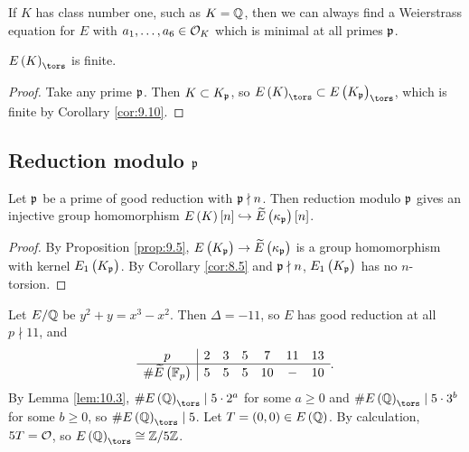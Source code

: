 \begin{remark*}
If $ K $ has class number one, such as $ K = \mathbb{Q} $, then we can always find a Weierstrass equation for $ E $ with $ a_1, \dots, a_6 \in \mathcal{O}_K $ which is minimal at all primes $ \mathfrak{p} $.
\end{remark*}

\begin{lemma}
$ E\br{K}_{\tors} $ is finite.
\end{lemma}

\begin{proof}
Take any prime $ \mathfrak{p} $. Then $ K \subset K_{\mathfrak{p}} $, so $ E\br{K}_{\tors} \subset E\br{K_\ppp}_{\tors} $, which is finite by Corollary \ref{cor:9.10}.
\end{proof}

\subsection{Reduction modulo \texorpdfstring{$ \mathfrak{p} $}{p}}

\begin{lemma}
\label{lem:10.3}
Let $ \mathfrak{p} $ be a prime of good reduction with $ \mathfrak{p} \nmid n $. Then reduction modulo $ \mathfrak{p} $ gives an injective group homomorphism $ E\br{K}\sbr{n} \hookrightarrow \widetilde{E}\br{\kappa_\ppp}\sbr{n} $.
\end{lemma}

\begin{proof}
By Proposition \ref{prop:9.5}, $ E\br{K_\ppp} \to \widetilde{E}\br{\kappa_\ppp} $ is a group homomorphism with kernel $ E_1\br{K_\ppp} $. By Corollary \ref{cor:8.5} and $ \mathfrak{p} \nmid n $, $ E_1\br{K_\ppp} $ has no $ n $-torsion.
\end{proof}

\begin{example*}
Let $ E / \mathbb{Q} $ be $ y^2 + y = x^3 - x^2 $. Then $ \Delta = -11 $, so $ E $ has good reduction at all $ p \nmid 11 $, and
$$
\begin{array}{c|cccccc}
p & 2 & 3 & 5 & 7 & 11 & 13 \\
\hline
\#\widetilde{E}\br{\FF_p} & 5 & 5 & 5 & 10 & - & 10
\end{array}.
$$
By Lemma \ref{lem:10.3}, $ \#E\br{\QQ}_{\tors} \mid 5 \cdot 2^a $ for some $ a \ge 0 $ and $ \#E\br{\QQ}_{\tors} \mid 5 \cdot 3^b $ for some $ b \ge 0 $, so $ \#E\br{\QQ}_{\tors} \mid 5 $. Let $ T = \br{0, 0} \in E\br{\QQ} $. By calculation, $ 5T = \mathcal{O} $, so $ E\br{\QQ}_{\tors} \cong \ZZ / 5\ZZ $.
\end{example*}

